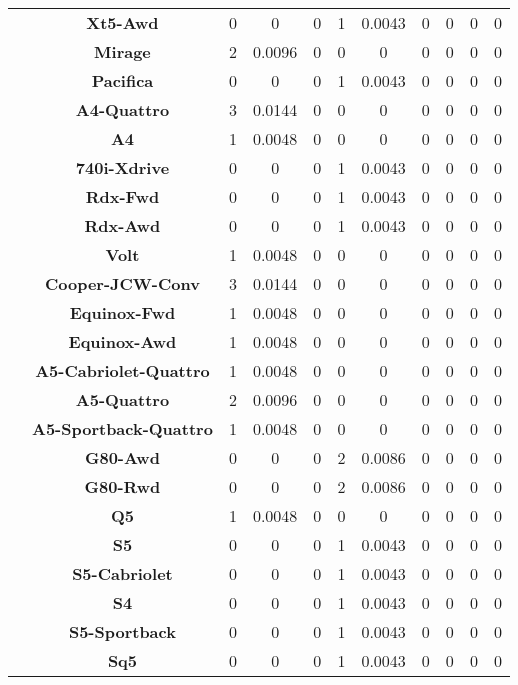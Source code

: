 \begin{center}
\begin{tabular}{|c|c||@{\hspace{1ex}}||c|c|c||@{\hspace{1ex}}||c|c|c||@{\hspace{1ex}}||c|c|c||@{\hspace{1ex}}||}
\cline{2-11}
  & {\bf Xt5-Awd} & 0 & 0 & 0 & 1 & 0.0043 & 0 & 0 & 0 & 0 \\
\cline{2-11}
  & {\bf Mirage} & 2 & 0.0096 & 0 & 0 & 0 & 0 & 0 & 0 & 0 \\
\cline{2-11}
  & {\bf Pacifica} & 0 & 0 & 0 & 1 & 0.0043 & 0 & 0 & 0 & 0 \\
\cline{2-11}
  & {\bf A4-Quattro} & 3 & 0.0144 & 0 & 0 & 0 & 0 & 0 & 0 & 0 \\
\cline{2-11}
  & {\bf A4} & 1 & 0.0048 & 0 & 0 & 0 & 0 & 0 & 0 & 0 \\
\cline{2-11}
  & {\bf 740i-Xdrive} & 0 & 0 & 0 & 1 & 0.0043 & 0 & 0 & 0 & 0 \\
\cline{2-11}
  & {\bf Rdx-Fwd} & 0 & 0 & 0 & 1 & 0.0043 & 0 & 0 & 0 & 0 \\
\cline{2-11}
  & {\bf Rdx-Awd} & 0 & 0 & 0 & 1 & 0.0043 & 0 & 0 & 0 & 0 \\
\cline{2-11}
  & {\bf Volt} & 1 & 0.0048 & 0 & 0 & 0 & 0 & 0 & 0 & 0 \\
\cline{2-11}
  & {\bf Cooper-JCW-Conv} & 3 & 0.0144 & 0 & 0 & 0 & 0 & 0 & 0 & 0 \\
\cline{2-11}
  & {\bf Equinox-Fwd} & 1 & 0.0048 & 0 & 0 & 0 & 0 & 0 & 0 & 0 \\
\cline{2-11}
  & {\bf Equinox-Awd} & 1 & 0.0048 & 0 & 0 & 0 & 0 & 0 & 0 & 0 \\
\cline{2-11}
  & {\bf A5-Cabriolet-Quattro} & 1 & 0.0048 & 0 & 0 & 0 & 0 & 0 & 0 & 0 \\
\cline{2-11}
  & {\bf A5-Quattro} & 2 & 0.0096 & 0 & 0 & 0 & 0 & 0 & 0 & 0 \\
\cline{2-11}
  & {\bf A5-Sportback-Quattro} & 1 & 0.0048 & 0 & 0 & 0 & 0 & 0 & 0 & 0 \\
\cline{2-11}
  & {\bf G80-Awd} & 0 & 0 & 0 & 2 & 0.0086 & 0 & 0 & 0 & 0 \\
\cline{2-11}
  & {\bf G80-Rwd} & 0 & 0 & 0 & 2 & 0.0086 & 0 & 0 & 0 & 0 \\
\cline{2-11}
  & {\bf Q5} & 1 & 0.0048 & 0 & 0 & 0 & 0 & 0 & 0 & 0 \\
\cline{2-11}
  & {\bf S5} & 0 & 0 & 0 & 1 & 0.0043 & 0 & 0 & 0 & 0 \\
\cline{2-11}
  & {\bf S5-Cabriolet} & 0 & 0 & 0 & 1 & 0.0043 & 0 & 0 & 0 & 0 \\
\cline{2-11}
  & {\bf S4} & 0 & 0 & 0 & 1 & 0.0043 & 0 & 0 & 0 & 0 \\
\cline{2-11}
  & {\bf S5-Sportback} & 0 & 0 & 0 & 1 & 0.0043 & 0 & 0 & 0 & 0 \\
\cline{2-11}
  & {\bf Sq5} & 0 & 0 & 0 & 1 & 0.0043 & 0 & 0 & 0 & 0 \\

\end{tabular}
\end{center}
